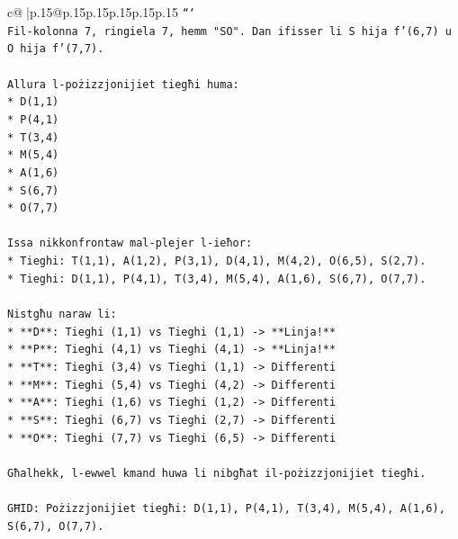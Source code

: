 \documentclass{article}
\begin{document}
{\begin{supertabular}{c@{$\;$}|p{.15\linewidth}@{}p{.15\linewidth}p{.15\linewidth}p{.15\linewidth}p{.15\linewidth}p{.15\linewidth}}
{{{\texttt{```} \\
\texttt{Fil{-}kolonna 7, ringiela 7, hemm "SO". Dan ifisser li S hija f'(6,7) u O hija f'(7,7).} \\
\\ 
\texttt{Allura l{-}pożizzjonijiet tiegħi huma:} \\
\texttt{*   D(1,1)} \\
\texttt{*   P(4,1)} \\
\texttt{*   T(3,4)} \\
\texttt{*   M(5,4)} \\
\texttt{*   A(1,6)} \\
\texttt{*   S(6,7)} \\
\texttt{*   O(7,7)} \\
\\ 
\texttt{Issa nikkonfrontaw mal{-}plejer l{-}ieħor:} \\
\texttt{*   Tieghi: T(1,1), A(1,2), P(3,1), D(4,1), M(4,2), O(6,5), S(2,7).} \\
\texttt{*   Tieghi: D(1,1), P(4,1), T(3,4), M(5,4), A(1,6), S(6,7), O(7,7).} \\
\\ 
\texttt{Nistgħu naraw li:} \\
\texttt{*   **D**: Tieghi (1,1) vs Tieghi (1,1) {-}> **Linja!**} \\
\texttt{*   **P**: Tieghi (4,1) vs Tieghi (4,1) {-}> **Linja!**} \\
\texttt{*   **T**: Tieghi (3,4) vs Tieghi (1,1) {-}> Differenti} \\
\texttt{*   **M**: Tieghi (5,4) vs Tieghi (4,2) {-}> Differenti} \\
\texttt{*   **A**: Tieghi (1,6) vs Tieghi (1,2) {-}> Differenti} \\
\texttt{*   **S**: Tieghi (6,7) vs Tieghi (2,7) {-}> Differenti} \\
\texttt{*   **O**: Tieghi (7,7) vs Tieghi (6,5) {-}> Differenti} \\
\\ 
\texttt{Għalhekk, l{-}ewwel kmand huwa li nibgħat il{-}pożizzjonijiet tiegħi.} \\
\\ 
\texttt{GĦID: Pożizzjonijiet tiegħi: D(1,1), P(4,1), T(3,4), M(5,4), A(1,6), S(6,7), O(7,7).} \\
            }
        }
    }
     \\ \\


\end{supertabular}}
\end{document}
